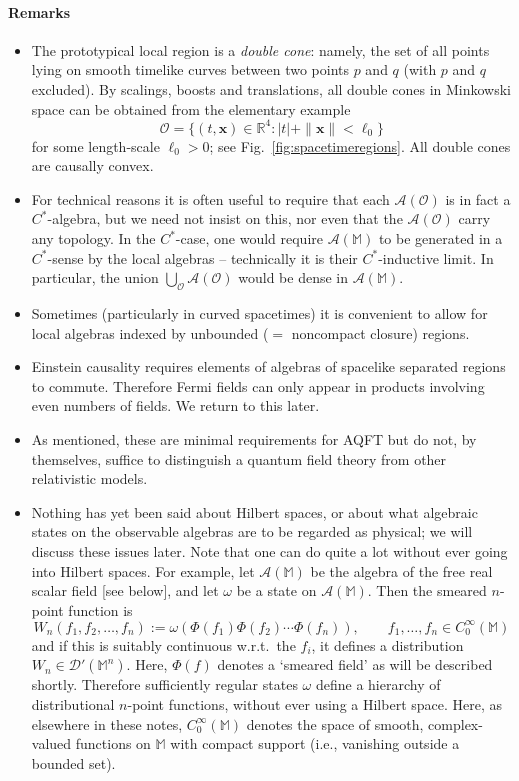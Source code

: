 \documentclass[12pt,a4paper]{article}
\newcommand{\1}{\mathds{1}}                         %
\newcommand{\RR}{\mathbb{R}}           %
\newcommand{\Ocal}{\mathcal{O}}
\newcommand{\MM}{\mathbb{M}}
\newcommand{\DD}{{\mathscr{D}}}
\newcommand{\xb}{{\boldsymbol{x}}}
\newcommand{\Ac}{{\mathcal{A}}}
\newcommand{\CoinX}[1]{C_0^\infty(#1)}
\begin{document}
	\paragraph{Remarks}
	\begin{itemize}
	\item The prototypical local region is a \emph{double cone}: namely, the set of all points
	lying on smooth timelike curves between two points $p$ and $q$ (with $p$ and $q$ excluded). By scalings, boosts and translations, all double cones in Minkowski space can be obtained from the elementary example
	\[
	\Ocal = \{(t,\xb)\in\RR^4: |t|+\|\xb\| < \ell_0 \}
	\]
	for some length-scale $\ell_0>0$; see Fig.~\ref{fig:spacetimeregions}. All double cones are causally convex.   
	\item For technical reasons it is often useful to require that each $\Ac(\Ocal)$ is in fact a $C^*$-algebra, but we need not insist on this, nor even that the $\Ac(\Ocal)$ carry any topology. In the $C^*$-case, one would require $\Ac(\MM)$ to be generated in a $C^*$-sense by the local algebras -- technically it is their $C^*$-inductive limit. In particular, the union $\bigcup_{\Ocal}\Ac(\Ocal)$ would be dense in $\Ac(\MM)$. 	
	\item Sometimes (particularly in curved spacetimes) it is convenient to allow for local algebras indexed by unbounded ($=$ noncompact closure) regions. 
 
	\item Einstein causality requires elements of algebras of spacelike separated regions to commute. Therefore Fermi fields can only appear in products involving even numbers of fields. We return to this later.	
	\item As mentioned, these are minimal requirements for AQFT but do not, by themselves, suffice to distinguish a quantum field theory from other relativistic models. 
	\item Nothing has yet been said about Hilbert spaces, or about what algebraic states on the observable algebras are to be regarded as physical; we will discuss these issues later. Note that one can do quite a lot without ever going into Hilbert spaces. For example, 
		let $\Ac(\MM)$ be the algebra of the free real scalar field [see below], and let $\omega$ be a state on $\Ac(\MM)$. Then the smeared $n$-point function is
		\[
		W_n(f_1,f_2,\ldots,f_n) := \omega(\Phi(f_1)\Phi(f_2)\cdots \Phi(f_n)), \qquad f_1,\ldots,f_n\in\CoinX{\MM}
		\]
		and if this is suitably continuous w.r.t.\ the $f_i$, it defines a distribution $W_n\in\DD'(\MM^n)$.
		Here, $\Phi(f)$ denotes a `smeared field' as will be described shortly. 
		Therefore sufficiently regular states $\omega$ define a hierarchy of distributional $n$-point functions, without ever using a Hilbert space. Here, as elsewhere in these notes, $\CoinX{\MM}$ denotes the space of smooth, complex-valued functions on $\MM$ with compact support (i.e., vanishing outside a bounded set).
	\end{itemize}
	
\end{document}
